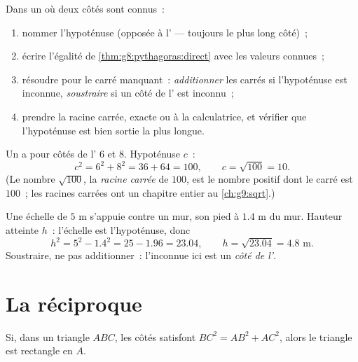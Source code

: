 \begin{method}\label{met:g8:pythagoras:compute}
Dans un  où deux côtés sont connus~:
\begin{enumerate}
  \item nommer l'hypoténuse (opposée à l' --- toujours le
        plus long côté)~;
  \item écrire l'égalité de \cref{thm:g8:pythagoras:direct} avec les
        valeurs connues~;
  \item résoudre pour le carré manquant~: \emph{additionner} les
        carrés si l'hypoténuse est inconnue, \emph{soustraire} si un
        côté de l' est inconnu~;
  \item prendre la racine carrée, exacte ou à la calculatrice, et
        vérifier que l'hypoténuse est bien sortie la plus longue.
\end{enumerate}
\end{method}

\begin{example}\label{ex:g8:pythagoras:hypotenuse}
Un  a pour côtés de l' $6$ et $8$.
Hypoténuse $c$~:
\[
c^2 = 6^2 + 8^2 = 36 + 64 = 100,
\qquad
c = \sqrt{100} = 10 .
\]
(Le nombre $\sqrt{100}$, la \emph{racine carrée} de $100$, est le
nombre positif dont le carré est $100$~; les racines carrées ont un
chapitre entier au \cref{ch:g9:sqrt}.)
\end{example}

\begin{example}\label{ex:g8:pythagoras:leg}
Une échelle de $5$ m s'appuie contre un mur, son pied à $1.4$ m du
mur. Hauteur atteinte $h$~: l'échelle est l'hypoténuse, donc
\[
h^2 = 5^2 - 1.4^2 = 25 - 1.96 = 23.04,
\qquad
h = \sqrt{23.04} = 4.8 \text{ m}.
\]
Soustraire, ne pas additionner~: l'inconnue ici est un \emph{côté de
l'}.
\end{example}

\section{La réciproque}

\begin{theorem}\label{thm:g8:pythagoras:converse}
Si, dans un triangle $ABC$, les côtés satisfont
$BC^2 = AB^2 + AC^2$, alors le triangle est rectangle en $A$.
\end{theorem}
\admitted

